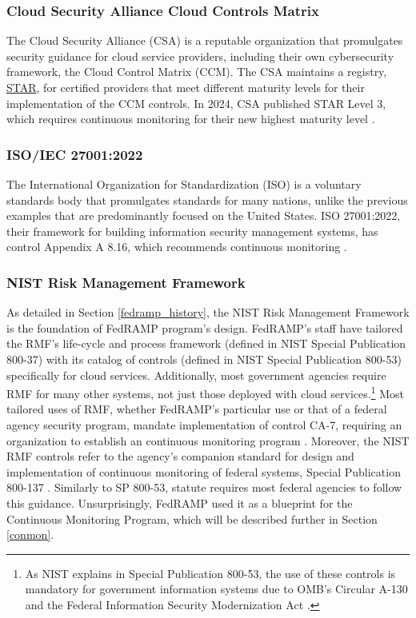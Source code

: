 \documentclass{jdf}
\begin{document}
\subsubsection{Cloud Security Alliance Cloud Controls Matrix}

The Cloud Security Alliance (CSA) is a reputable organization that promulgates security guidance for cloud service providers, including their own cybersecurity framework, the Cloud Control Matrix (CCM). The CSA maintains a registry, \href{https://cloudsecurityalliance.org/star/registry}{STAR}, for certified providers that meet different maturity levels for their implementation of the CCM controls. In 2024, CSA published STAR Level 3, which requires continuous monitoring for their new highest maturity level \citeyear{csa_starl3_21}.

\subsubsection{ISO/IEC 27001:2022}

The International Organization for Standardization (ISO) is a voluntary standards body that promulgates standards for many nations, unlike the previous examples that are predominantly focused on the United States. ISO 27001:2022, their framework for building information security management systems, has control Appendix A 8.16, which recommends continuous monitoring \citeyear{iso27001_22}.

\subsubsection{NIST Risk Management Framework} \label{rmf}

As detailed in Section \ref{fedramp_history}, the NIST Risk Management Framework is the foundation of FedRAMP program's design. FedRAMP's staff have tailored the RMF's life-cycle and process framework (defined in NIST Special Publication 800-37) with its catalog of controls (defined in NIST Special Publication 800-53) specifically for cloud services. Additionally, most government agencies require RMF for many other systems, not just those deployed with cloud services.\footnote{As NIST explains in Special Publication 800-53, the use of these controls is mandatory for government information systems due to OMB's Circular A-130 and the Federal Information Security Modernization Act \citeyear[p.~2]{sp80053r5}.} Most tailored uses of RMF, whether FedRAMP's particular use or that of a federal agency security program, mandate implementation of control CA-7, requiring an organization to establish an continuous monitoring program \citeyear[pp.~90-91]{sp80053r5}. Moreover, the NIST RMF controls refer to the agency's companion standard for design and implementation of continuous monitoring of federal systems, Special Publication 800-137 \citeyear{sp800137}. Similarly to SP 800-53, statute requires most federal agencies to follow this guidance. Unsurprisingly, FedRAMP used it as a blueprint for the Continuous Monitoring Program, which will be described further in Section \ref{conmon}.
\end{document}
